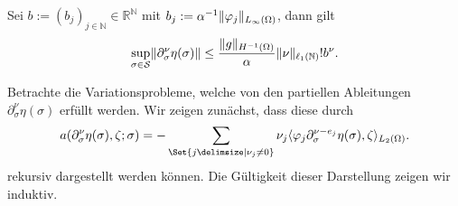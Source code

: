 \begin{Satz}
\label{satz:ps:rg:partielle_ableitungen_schranke}
    Sei $b := (b_{j})_{j \in \mathbb{N}} \in \mathbb{R}^{\mathbb{N}}$ mit $b_{j} := \alpha^{-1} \lVert\varphi_{j}\rVert_{L_{\infty}(\Omega)}$, dann gilt
    \begin{equation}
    \label{eq:ps:rg:partielle_ableitungen_schranke}
        \sup_{\sigma \in \mathcal S} \lVert\partial^{\nu}_{\sigma} \eta(\sigma)\rVert \leq \frac{\lVert g\rVert_{H^{-1}(\Omega)}}{\alpha} \lVert\nu\rVert_{\ell_{1}(\mathbb{N})}! b^{\nu}.
    \end{equation}

    \begin{Beweis}
        Betrachte die Variationsprobleme, welche von den partiellen Ableitungen $\partial^{\nu}_{\sigma} \eta(\sigma)$ erfüllt werden.
        Wir zeigen zunächst, dass diese durch
        \begin{equation}
        \label{eq:ps:rg:partielle_ableitungen_rekursive_ableitungen}
            a(\partial^{\nu}_{\sigma} \eta(\sigma), \zeta; \sigma)
            = - \sum_{\Set{j \given \nu_{j} \neq 0}} \nu_{j} \skp{\varphi_{j} \partial^{\nu - e_{j}}_{\sigma} \eta(\sigma)}{\zeta}{L_{2}(\Omega)}.
        \end{equation}
        rekursiv dargestellt werden können.
        Die Gültigkeit dieser Darstellung zeigen wir induktiv.


\end{Beweis}
\end{Satz}
